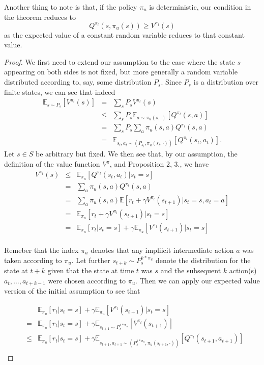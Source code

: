 \documentclass[11pt]{article} %
\begin{document}
Another thing to note is that, if the policy $\pi_u$ is deterministic, our condition in the theorem reduces to $$Q^{\pi_l}(s,\pi_u(s)) \ge V^{\pi_l}(s)$$ as the expected value of a constant random variable reduces to that constant value.

\begin{proof}
	We first need to extend our assumption to the case where the state $s$ appearing on both sides is not fixed, but more generally a random variable distributed according to, say, some distribution $P_s$. Since $P_s$ is a distribution over finite states, we can see that indeed
	\[
		\begin{array}{rll}
			\mathbb{E}_{s \sim P_s}[V^{\pi_l}(s)] & = & \sum_s P_s V^{\pi_l}(s) \\
				& \le & \sum_s P_s \mathbb{E}_{a \sim \pi_u(s,\cdot)}[Q^{\pi_l}(s,a)] \\
				& = & \sum_s P_s \sum_a \pi_u(s,a) Q^{\pi_l}(s,a) \\
				& = & \mathbb{E}_{s_t ,a_t \sim (P_{s_t},\pi_u(s_t,\cdot))}[Q^{\pi_l}(s_t,a_t)].
		\end{array}
	\]
	Let $s \in S$ be arbitrary but fixed. We then see that, by our assumption, the definition of the value function $V^{\pi}$, and Proposition 2, 3., we have
	\[
		\begin{array}{rll}
			V^{\pi_l}(s) &	\le 	&	\mathbb{E}_{\pi_u}[Q^{\pi_l}(s_t,a_t) | s_t = s] \\
						&	=	&	\sum_a \pi_u(s,a) Q^{\pi_l}(s,a) \\
						&	=	&	\sum_a \pi_u(s,a) \mathbb{E}[r_t + \gamma V^{\pi_l}(s_{t+1}) | s_t = s, a_t = a]\\
						&	= 	&	\mathbb{E}_{\pi_u}[r_t + \gamma V^{\pi_l}(s_{t+1}) | s_t = s] \\
						&	=	&	\mathbb{E}_{\pi_u}[r_t | s_t = s] + \gamma \mathbb{E}_{\pi_u}[V^{\pi_l}(s_{t+1}) | s_t = s] \\
		\end{array}
	\]

	Remeber that the index $\pi_u$ denotes that any impliicit intermediate action $a$ was taken according to $\pi_u$. Let further $s_{t+k} \sim P_{s}^{k * \pi_u}$ denote the distribution for the state at $t+k$ given that the state at time $t$ was $s$ and the subsequent $k$ action(s) $a_t,\dots,a_{t+k-1}$ were chosen according to $\pi_u$. Then we can apply our expected value version of the initial assumption to see that

	\[
		\begin{array}{rll}
			& & \mathbb{E}_{\pi_u}[r_t | s_t = s] + \gamma \mathbb{E}_{\pi_u}[V^{\pi_l}(s_{t+1}) | s_t = s] \\
			& = & \mathbb{E}_{\pi_u}[r_t | s_t = s] + \gamma \mathbb{E}_{s_{t+1} \sim P_s^{1 * \pi_u}}[V^{\pi_l}(s_{t+1})] \\
			& \le &	\mathbb{E}_{\pi_u}[r_t | s_t = s] + \gamma \mathbb{E}_{s_{t+1},a_{t+1} \sim (P_s^{1 * \pi_u}, \pi_u(s_{t+1},\cdot))}[Q^{\pi_l}(s_{t+1},a_{t+1})] \\
		\end{array}
	\]


\end{proof}
\end{document}
